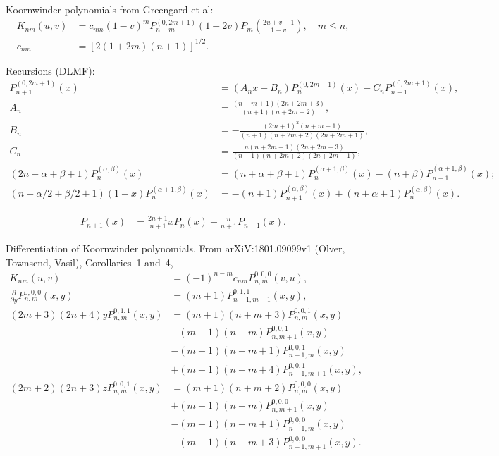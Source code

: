 \documentclass[a4paper,12pt]{article}
\newcommand{\ppoly}[3]{P_{#1,#2}^{#3}}
\begin{document}
Koornwinder polynomials from Greengard et al:
\begin{align}
  \label{equ:koornwinder:1}
  K_{nm}(u,v)
  &=
    c_{nm}(1-v)^{m}
    P_{n-m}^{(0,2m+1)}(1-2v)
    P_{m}
    \left(
    \frac{2u+v-1}{1-v}
  \right), \quad m\leq n,\\
  c_{nm} &=
  \left[
    2(1+2m)(n+1)
  \right]^{1/2}.
\end{align}

Recursions (DLMF):
\begin{align}
  \label{equ:jacobi:1}
  P_{n+1}^{(0,2m+1)}(x)
  &=
    (A_{n}x + B_{n})P_{n}^{(0,2m+1)}(x) -
    C_{n}P_{n-1}^{(0,2m+1)}(x),\\
  A_{n} &= \frac{(n+m+1)(2n+2m+3)}{(n+1)(n+2m+2)},\\
  B_{n} &= -\frac{(2m+1)^{2}(n+m+1)}{(n+1)(n+2m+2)(2n+2m+1)},\\
  C_{n} &= \frac{n(n+2m+1)(2n+2m+3)}{(n+1)(n+2m+2)(2n+2m+1)},\\
  \label{equ:jacobi:1}
  (2n + \alpha + \beta + 1)P_{n}^{(\alpha,\beta)}(x) &=
  (n + \alpha + \beta + 1)P_{n}^{(\alpha+1,\beta)}(x) -
  (n + \beta)P_{n-1}^{(\alpha+1,\beta)}(x);\\
  \label{equ:jacobi:3}
  (n+\alpha/2 + \beta/2 + 1)(1-x)P_{n}^{(\alpha+1,\beta)}(x) &=
  -(n+1)P_{n+1}^{(\alpha,\beta)}(x) +
  (n+\alpha+1)P_{n}^{(\alpha,\beta)}(x).    
\end{align}

\begin{align}
  \label{equ:legendre}
  P_{n+1}(x)
  &=
    \frac{2n+1}{n+1}xP_{n}(x) - \frac{n}{n+1}P_{n-1}(x).
\end{align}

Differentiation of Koornwinder polynomials. From arXiV:1801.09099v1
(Olver, Townsend, Vasil), Corollaries~1 and~4, 
\begin{align}
  \label{equ:kw:otv}
  K_{nm}(u,v)
  &=
  (-1)^{n-m}c_{nm} P_{n,m}^{0,0,0}(v,u),\\
  \frac{\partial}{\partial y} P_{n,m}^{0,0,0}(x,y)
  &=
  (m+1)\ppoly{n-1}{m-1}{0,1,1}(x,y),\\
  (2m+3)(2n+4)y\ppoly{n}{m}{0,1,1}(x,y)
  &=
  (m+1)(n+m+3)\ppoly{n}{m}{0,0,1}(x,y) \nonumber\\
  & - (m+1)(n-m)\ppoly{n}{m+1}{0,0,1}(x,y) \nonumber\\
  & - (m+1)(n-m+1)\ppoly{n+1}{m}{0,0,1}(x,y) \nonumber\\
  & + (m+1)(n+m+4)\ppoly{n+1}{m+1}{0,0,1}(x,y),\\
  (2m+2)(2n+3)z\ppoly{n}{m}{0,0,1}(x,y)
  &=
  (m+1)(n+m+2)\ppoly{n}{m}{0,0,0}(x,y) \nonumber\\
  & + (m+1)(n-m)\ppoly{n}{m+1}{0,0,0}(x,y) \nonumber\\
  & - (m+1)(n-m+1)\ppoly{n+1}{m}{0,0,0}(x,y) \nonumber\\
  & - (m+1)(n+m+3)\ppoly{n+1}{m+1}{0,0,0}(x,y).
\end{align}
\end{document}
